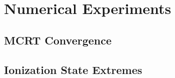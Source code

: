 \chapter{Numerical Experiments}

\section{MCRT Convergence}

\section{Ionization State Extremes}
\label{sec:ionization_extremes}
